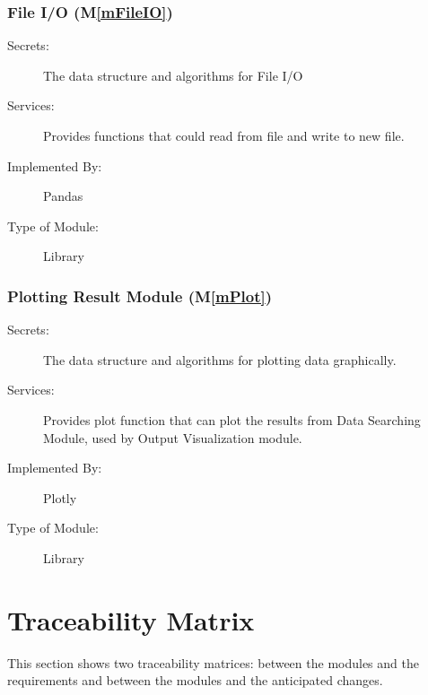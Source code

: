 \documentclass[12pt, titlepage]{article}
\newcommand{\mref}[1]{M\ref{#1}}
\begin{document}
\subsubsection{File I/O (\mref{mFileIO})}
\begin{description}
\item[Secrets:] The data structure and algorithms for File I/O 
\item[Services:] Provides functions that could read from file and write to new file. 
\item[Implemented By:] Pandas
\item[Type of Module:] Library
\end{description}

\subsubsection{Plotting Result Module (\mref{mPlot})}
\begin{description}
\item[Secrets:] The data structure and algorithms for plotting data graphically. 
\item[Services:] Provides plot function that can plot the results from Data Searching Module, used by Output Visualization module. 
\item[Implemented By:] Plotly 
\item[Type of Module:] Library
\end{description}

\section{Traceability Matrix} \label{SecTM}

This section shows two traceability matrices: between the modules and the
requirements and between the modules and the anticipated changes.
\end{document}
